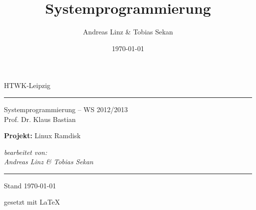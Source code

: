 

\title{Systemprogrammierung}
\author{Andreas Linz & Tobias Sekan}
\date{\today}


    \begin{titlepage}
        \begin{center}
        {\LARGE HTWK-Leipzig}\\[\baselineskip]
        \hrule \vspace{12pt}
        {\Large Systemprogrammierung -- WS 2012/2013}\\
        {\normalsize Prof. Dr. Klaus Bastian}\\[2\baselineskip]
        
        \vfill

		{\LARGE \textbf{Projekt:} Linux Ramdisk}
		
		\vfill
		
        \textit{bearbeitet von:\\Andreas Linz \& Tobias Sekan}\\[\baselineskip]
        \hrule
        Stand \today
        \begin{flushright}
         gesetzt mit \LaTeX
        \end{flushright}
        \end{center}
    \end{titlepage}

    \tableofcontents

    \newpage

	\setcounter{page}{1}

	
	\newpage
	
	\newpage
    
    \newpage

	\appendix

	


